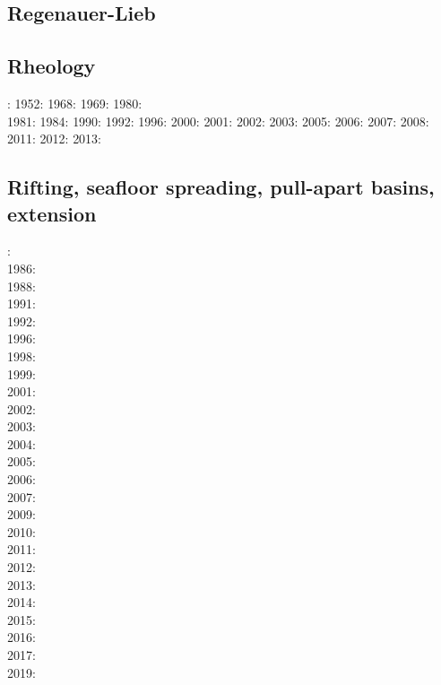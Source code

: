 \subsection*{Regenauer-Lieb}

\noindent
\cite{reyu00}
\cite{reyu03}
\cite{reyu04}
\cite{rehy06}\cite{rewr06}
\cite{rerw08}
\cite{reps09}
\cite{revp13}

\subsection*{Rheology}

: \cite{druc51}\cite{hafn51}
1952: \cite{drpr52}
1968: \cite{byer68}
1969: \cite{hand69}
1980: \cite{brko80}\\
1981: \cite{delo81}
1984: \cite{rafi84}
1990: \cite{wica90}
1992: \cite{bako92}
1996: \cite{wasd96}
2000: \cite{rydr00}\cite{rana00}
2001: \cite{lova01}
2002: \cite{hirt02}
2003: \cite{hiko03}
2005: \cite{didr05}\cite{drur05}
2006: \cite{rygw06}\cite{buwa06}
2007: \cite{hirw07}
2008: \cite{lemm08}\cite{budr08}
2011: \cite{lell11}
2012: \cite{reyn12}
2013: \cite{lepo13}


\subsection*{Rifting, seafloor spreading, pull-apart basins, extension}

: \cite{bosw85}\\
1986: \cite{hoen86b}\\
1988: \cite{bums88}\\
1991: \cite{trbr91}\cite{buck91}\\
1992: \cite{zieg92b}\\
1996: \cite{dusa96}\cite{beda96}\\
1998: \cite{rafm98}\\
1999: \cite{brun99}\cite{bulp99}\\
2001: \cite{hupc01}\\
2002: \cite{hube02}\cite{hani02}\cite{dabm02}\\
2003: \cite{hube03}\cite{hani03}\\
2004: \cite{hier04}\\
2005: \cite{hubb05}\\
2006: \cite{tibs06}\\
2007: \cite{huha07}\\
2009: \cite{agcz09}\\
2010: \cite{aubh10}\\
2011: \cite{alht11}\\
2012: \cite{alht12}\cite{brps12}\\
2013: \cite{alhf13}\cite{brau13}\\
2014: \cite{hebr14}\cite{lige14}\cite{brun14}\\
2015: \cite{nabu15}\\
2016: \cite{olbm16}\cite{jekm16}\\
2017: \cite{lemh17}\\
2019: \cite{lisp19}


